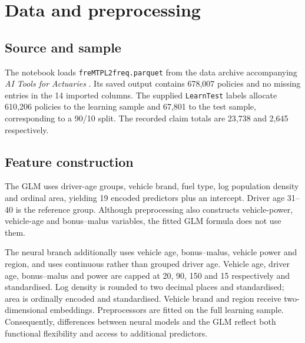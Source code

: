 \documentclass[a4paper]{article}
\begin{document}
\section{Data and preprocessing}
\subsection{Source and sample}
The notebook loads \texttt{freMTPL2freq.parquet} from the data archive
accompanying \emph{AI Tools for Actuaries} \cite{resources}.
Its saved output contains 678,007 policies and no missing entries in the
14 imported columns.
The supplied \texttt{LearnTest} labels allocate 610,206 policies to the
learning sample and 67,801 to the test sample, corresponding to a 90/10 split.
The recorded claim totals are 23,738 and 2,645 respectively.


\subsection{Feature construction}
The GLM uses driver-age groups, vehicle brand, fuel type, log population
density and ordinal area, yielding 19 encoded predictors plus an intercept.
Driver age 31--40 is the reference group.
Although preprocessing also constructs vehicle-power, vehicle-age and
bonus--malus variables, the fitted GLM formula does not use them.

The neural branch additionally uses vehicle age, bonus--malus, vehicle
power and region, and uses continuous rather than grouped driver age.
Vehicle age, driver age, bonus--malus and power are capped at 20, 90, 150
and 15 respectively and standardised.
Log density is rounded to two decimal places and standardised; area is
ordinally encoded and standardised.
Vehicle brand and region receive two-dimensional embeddings.
Preprocessors are fitted on the full learning sample.
Consequently, differences between neural models and the GLM reflect both
functional flexibility and access to additional predictors.
\end{document}
